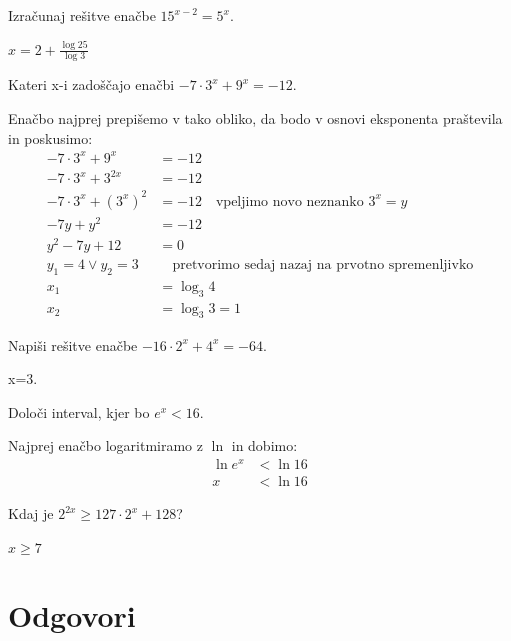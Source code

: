 \begin{vaja}
	Izračunaj rešitve enačbe \( 15^{x-2}=5^x\).
  \begin{odgovor}
   	$x=2+\frac{\log25}{\log3}$
  \end{odgovor}
\end{vaja}

\begin{vaja}
	Kateri x-i zadoščajo enačbi \(-7\cdot 3^x+9^x=-12\).
  \begin{odgovor}
   	Enačbo najprej prepišemo v tako obliko, da bodo v osnovi eksponenta praštevila in poskusimo:
	\begin{align*}
	-7 \cdot 3^x+9^x&=-12\\
	-7\cdot 3^x+3^{2x}&=-12\\
	-7\cdot 3^x+(3^x)^2&=-12\quad \text{vpeljimo novo neznanko } 3^x=y\\
	-7y+y^2&=-12\\
	y^2-7y+12&=0\\
	y_{1}=4 \lor y_{2}=3 & \quad \text{pretvorimo sedaj nazaj na prvotno spremenljivko}\\
	x_{1}&=\log_{3}{4}\\
	x_{2}&=\log_{3}{3}=1
	\end{align*}
  \end{odgovor}
\end{vaja}

\begin{vaja}
	Napiši rešitve enačbe $-16 \cdot 2^x+4^x=-64$.
  \begin{odgovor}
   	x=3.
  \end{odgovor}
\end{vaja}

\begin{vaja}
Določi interval, kjer bo $e^x < 16$.
  \begin{odgovor}
   Najprej enačbo logaritmiramo z $\ln$ in dobimo:
\begin{align*}
\ln{e^x}&< \ln 16 \\
x &< \ln 16
\end{align*}
  \end{odgovor}
\end{vaja}

\begin{vaja}
Kdaj je $2^{2x} \geq 127 \cdot 2^x + 128$?
  \begin{odgovor}
   $x \geq 7$
  \end{odgovor}
\end{vaja}

\begin{vaja}
  \begin{odgovor}
   
  \end{odgovor}
\end{vaja}



\section{Odgovori}
\label{sec:explog-odgovori}




